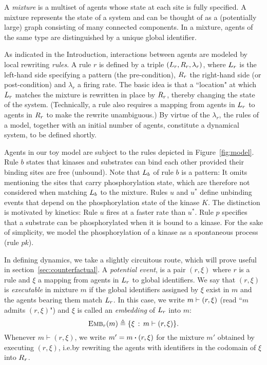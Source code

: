 A \emph{mixture} is a multiset of agents whose state at each site is
fully specified. A mixture represents the state of a system and can be
thought of as a (potentially large) graph consisting of many connected
components. In a mixture, agents of the same type are distinguished by
a unique global identifier.



As indicated in the Introduction, interactions between agents are
modeled by local rewriting \emph{rules}.  A rule $r$ is defined by a
triple $(L_{r}, R_{r}, \lambda_r)$, where $L_{r}$ is the
left-hand side specifying a pattern (the pre-condition), $R_{r}$
the right-hand side (or post-condition) and $\lambda_r$ a firing rate.
The basic idea is that a ``location" at which $L_{r}$ matches the
mixture is rewritten in place by $R_{r}$, thereby changing the
state of the system. (Technically, a rule also requires a mapping from
agents in $L_{r}$ to agents in $R_{r}$ to make the rewrite
unambiguous.) By virtue of the $\lambda_r$, the rules of a model,
together with an initial number of agents, constitute a dynamical
system, to be defined shortly.

Agents in our toy model are subject to the rules depicted in
Figure~\ref{fig:model}. Rule $b$ states that kinases and substrates
can bind each other provided their binding sites are free
(unbound). Note that $L_{b}$ of rule $b$ is a pattern: It omits
mentioning the sites that carry phosphorylation state, which are
therefore not considered when matching $L_{b}$ to the
mixture. Rules $u$ and $u^{*}$ define unbinding events that depend on
the phosphorylation state of the kinase $K$. The distinction is
motivated by kinetics: Rule $u$ fires at a faster rate than $u^{*}$.
Rule $p$ specifies that a substrate can be phosphorylated when it is
bound to a kinase. For the sake of simplicity, we model the
phosphorylation of a kinase as a spontaneous process (rule $pk$).



In defining dynamics, we take a slightly circuitous route, which will
prove useful in section~\ref{sec:counterfactual}. A \emph{potential
  event}, is a pair $(r, \xi)$ where $r$ is a rule and $\xi$ a mapping
from agents in $L_{r}$ to global identifiers. We say that
$(r, \xi)$ is \emph{executable} in mixture $m$ if the global
identifiers assigned by $\xi$ exist in $m$ and the agents bearing them
match $L_{r}$. In this case, we write $m \vdash (r, \xi)$
(read ``$m$ admits $(r, \xi)$") and $\xi$ is called an
\emph{embedding} of $L_{r}$ into $m$:
\[{\textsc{Emb}}_{r}(m) \triangleq \{ \xi \,:\, m \vdash (r, \xi)\}.\]
Whenever $m \vdash (r, \xi)$, we write $m'=\UPDATE{m}{(r, \xi)}$ for
the mixture $m'$ obtained by executing $(r, \xi)$, i.e.\@ by rewriting
the agents with identifiers in the codomain of $\xi$ into $R_{r}$.

